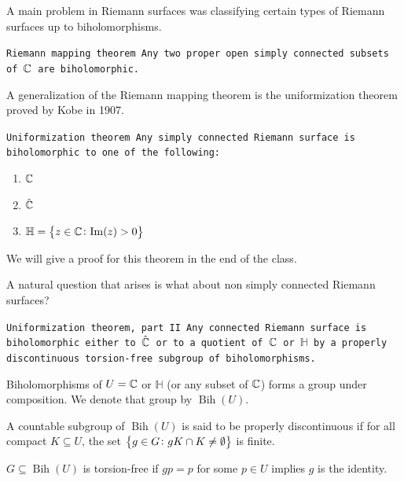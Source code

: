 \documentclass[11pt,a4paper]{article}
\DeclareMathOperator{\Bih}{Bih}
\renewcommand{\H}{\mathbb H}
\begin{document}
A main problem in Riemann surfaces was classifying certain types of 
Riemann surfaces up to biholomorphisms.

\begin{theorem}\tt{Riemann mapping theorem}
    Any two proper open simply connected subsets of $\mathbb{C}$ are biholomorphic.
\end{theorem}

A generalization of the Riemann mapping theorem is the uniformization theorem
proved by Kobe in 1907.

\begin{theorem}\tt{Uniformization theorem}
    Any simply connected Riemann surface is biholomorphic to one of the
    following:
    \begin{enumerate}
        \item[(1)] $\mathbb{C}$
        \item[(2)] $\hat{\mathbb{C}}$
        \item[(3)] $\H = \set{z \in \C \colon \mathrm{Im}(z) > 0}$
    \end{enumerate}
\end{theorem}

We will give a proof for this theorem in the end of the class.

A natural question that arises is what about non simply connected Riemann
surfaces?

\begin{theorem}\tt{Uniformization theorem, part II}
    Any connected Riemann surface is biholomorphic either to $\hat{\mathbb{C}}$
    or to a quotient of $\mathbb{C}$ or $\H$ by a properly discontinuous
    torsion-free subgroup of biholomorphisms.
\end{theorem}

\begin{remark}
    Biholomorphisms of $U = \mathbb{C}$ or $\H$ (or any subset of $\mathbb{C}$)
    forms a group under composition.
    We denote that group by $\Bih(U)$.
\end{remark}

\begin{definition}
    A countable subgroup of $\Bih(U)$ is said to be properly discontinuous
    if for all compact $K \subseteq U$, the set 
    $\left\{g \in G \colon gK \cap K \neq \emptyset\right\}$ is finite.
\end{definition}

\begin{definition}
    $G \subseteq \Bih(U)$ is torsion-free if $gp = p$ for some $p \in U$
    implies $g$ is the identity.
\end{definition}
\end{document}
